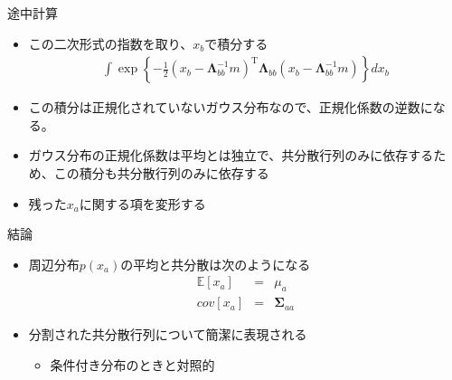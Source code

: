 \begin{frame}{途中計算}
 \begin{itemize}
  \item この二次形式の指数を取り、$x_b$で積分する
        \begin{eqnarray}
         \int \exp\left\{-\frac{1}{2}(x_b-\bm{\Lambda}_{bb}^{-1}m)^{\mathrm{T}}\bm{\Lambda}_{bb}(x_b-\bm{\Lambda}_{bb}^{-1}m)\right\}dx_b
        \end{eqnarray}
  \item この積分は正規化されていないガウス分布なので、正規化係数の逆数になる。
  \item ガウス分布の正規化係数は平均とは独立で、共分散行列のみに依存するため、この積分も共分散行列のみに依存する
  \item 残った$x_a$に関する項を変形する
 \end{itemize}
\end{frame}

\begin{frame}{結論}
 \begin{itemize}
  \item 周辺分布$p(x_a)$の平均と共分散は次のようになる
        \begin{eqnarray}
         \mathbb{E}[x_a] &=&  \mu_a\\
         cov[x_a]&=&\bm{\Sigma}_{aa}
        \end{eqnarray}
  \item 分割された共分散行列について簡潔に表現される
        \begin{itemize}
         \item 条件付き分布のときと対照的
        \end{itemize}
 \end{itemize}
\end{frame}

